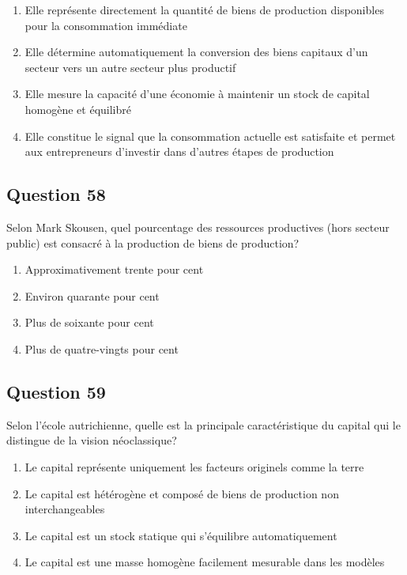 \documentclass[12pt,a4paper]{article}
\begin{document}
\begin{enumerate}[label=\Alph*., leftmargin=*]
\item Elle représente directement la quantité de biens de production disponibles pour la consommation immédiate
\item Elle détermine automatiquement la conversion des biens capitaux d'un secteur vers un autre secteur plus productif
\item Elle mesure la capacité d'une économie à maintenir un stock de capital homogène et équilibré
\item Elle constitue le signal que la consommation actuelle est satisfaite et permet aux entrepreneurs d'investir dans d'autres étapes de production
\end{enumerate}

\bigskip


\subsection*{Question 58}
Selon Mark Skousen, quel pourcentage des ressources productives (hors secteur public) est consacré à la production de biens de production?

\begin{enumerate}[label=\Alph*., leftmargin=*]
\item Approximativement trente pour cent
\item Environ quarante pour cent
\item Plus de soixante pour cent
\item Plus de quatre-vingts pour cent
\end{enumerate}

\bigskip


\subsection*{Question 59}
Selon l'école autrichienne, quelle est la principale caractéristique du capital qui le distingue de la vision néoclassique?

\begin{enumerate}[label=\Alph*., leftmargin=*]
\item Le capital représente uniquement les facteurs originels comme la terre
\item Le capital est hétérogène et composé de biens de production non interchangeables
\item Le capital est un stock statique qui s'équilibre automatiquement
\item Le capital est une masse homogène facilement mesurable dans les modèles
\end{enumerate}
\end{document}
